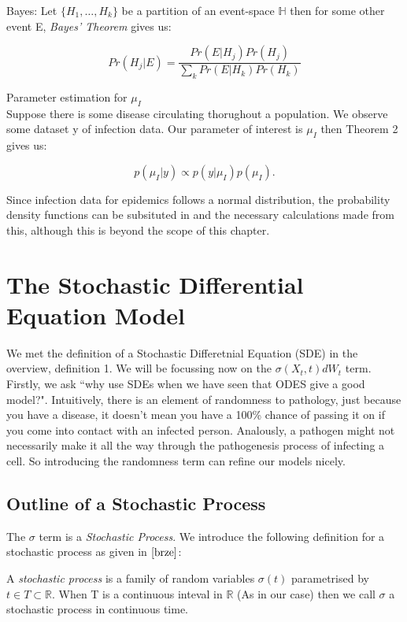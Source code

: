 \newpage

\begin{theorem}{Bayes:}
Let $\{H_1,\ldots,H_k\}$ be a partition of an event-space $\mathbb{H}$ then for some other event E, \textit{Bayes' Theorem} gives us:

\begin{equation}        
    Pr(H_j | E) = \frac{Pr(E|H_j)Pr(H_j)}{\sum_k Pr(E|H_k)Pr(H_k)}
\end{equation}

\end{theorem}

\begin{example}{Parameter estimation for $\mu_I$} \\
    Suppose there is some disease circulating thorughout a population. We observe some dataset y of infection data. Our parameter of interest is $\mu_I$ then Theorem 2 gives us:

    \[
        p(\mu_I | y) \propto p(y|\mu_I)p(\mu_I)
    .\] 

Since infection data for epidemics follows a normal distribution, the probability density functions can be subsituted in and the necessary calculations made from this, although this is beyond the scope of this chapter.
\end{example}

\section{The Stochastic Differential Equation Model}
We met the definition of a Stochastic Differetnial Equation (SDE) in the overview, definition 1. We will be focussing now on the $\sigma(X_t,t)dW_t$ term. Firstly, we ask ``why use SDEs when we have seen that ODES give a good model?". Intuitively, there is an element of randomness to pathology, just because you have a disease, it doesn't mean you have a 100\% chance of passing it on if you come into contact with an infected person. Analously, a pathogen might not necessarily make it all the way through the pathogenesis process of infecting a cell. So introducing the randomness term can refine our models nicely.

\subsection{Outline of a Stochastic Process}
The $\sigma$ term is a  \textit{Stochastic Process}. We introduce the following definition for a stochastic process as given in $\cite{brze}$:

\begin{definition}
    A \textit{stochastic process} is a family of random variables $\sigma(t)$ parametrised by  $t \in T \subset \mathbb{R}$. When T is a continuous inteval in $\mathbb{R}$ (As in our case) then we call $\sigma$ a stochastic process in continuous time.
\end{definition}

{}

